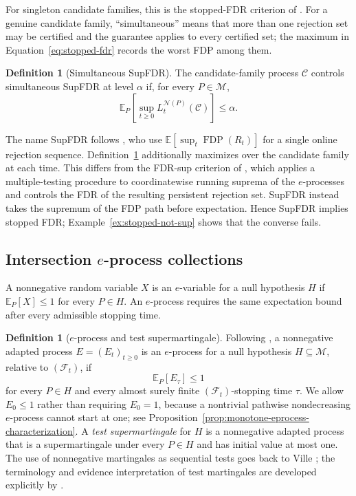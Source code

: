 \documentclass[11pt]{article}
\numberwithin{equation}{section}
\theoremstyle{plain}
\theoremstyle{definition}
\newtheorem{definition}[theorem]{Definition}
\newcommand{\E}{\mathbb E}
\newcommand{\F}{\mathcal F}
\newcommand{\M}{\mathcal M}
\newcommand{\C}{\mathcal C}
\newcommand{\FDP}{\operatorname{FDP}}
\newcommand{\calN}{\mathcal N}
\newcommand{\loss}{L}
\begin{document}
For singleton candidate families, this is the stopped-FDR criterion of \citet{WangDandapanthulaRamdas2025}. For a genuine candidate family, ``simultaneous'' means that more than one rejection set may be certified and the guarantee applies to every certified set; the maximum in Equation~\eqref{eq:stopped-fdr} records the worst FDP among them.

\begin{definition}[Simultaneous SupFDR]\label{def:supfdr}
The candidate-family process $\C$ controls simultaneous SupFDR at level $\alpha$ if, for every $P\in\M$,
\begin{equation}\label{eq:supfdr}
  \E_P\!\left[\sup_{t\geq0}\loss_t^{\calN(P)}(\C)\right]\leq\alpha.
\end{equation}
\end{definition}

The name SupFDR follows \citet{XuRamdas2022Dynamic}, who use $\E[\sup_t\FDP(R_t)]$ for a single online rejection sequence. Definition~\ref{def:supfdr} additionally maximizes over the candidate family at each time. This differs from the FDR-sup criterion of \citet{TavyrikovGoemanDeHeide2026}, which applies a multiple-testing procedure to coordinatewise running suprema of the $e$-processes and controls the FDR of the resulting persistent rejection set. SupFDR instead takes the supremum of the FDP path before expectation. Hence SupFDR implies stopped FDR; Example~\ref{ex:stopped-not-sup} shows that the converse fails.

\subsection{Intersection \texorpdfstring{$e$}{e}-process collections}

A nonnegative random variable $X$ is an $e$-variable for a null hypothesis $H$ if $\E_P[X]\leq1$ for every $P\in H$. An $e$-process requires the same expectation bound after every admissible stopping time.

\begin{definition}[$e$-process and test supermartingale]\label{def:eprocess}
Following \citet{RamdasWangBook}, a nonnegative adapted process $E=(E_t)_{t\geq0}$ is an $e$-process for a null hypothesis $H\subseteq\M$, relative to $(\F_t)$, if
\begin{equation}\label{eq:eprocess}
  \E_P[E_\tau]\leq1
\end{equation}
for every $P\in H$ and every almost surely finite $(\F_t)$-stopping time $\tau$. We allow $E_0\leq1$ rather than requiring $E_0=1$, because a nontrivial pathwise nondecreasing $e$-process cannot start at one; see Proposition~\ref{prop:monotone-eprocess-characterization}. A \emph{test supermartingale} for $H$ is a nonnegative adapted process that is a supermartingale under every $P\in H$ and has initial value at most one. The use of nonnegative martingales as sequential tests goes back to Ville \citep{Ville1939}; the terminology and evidence interpretation of test martingales are developed explicitly by \citet{ShaferEtAl2011TestMartingales}.
\end{definition}
\end{document}
